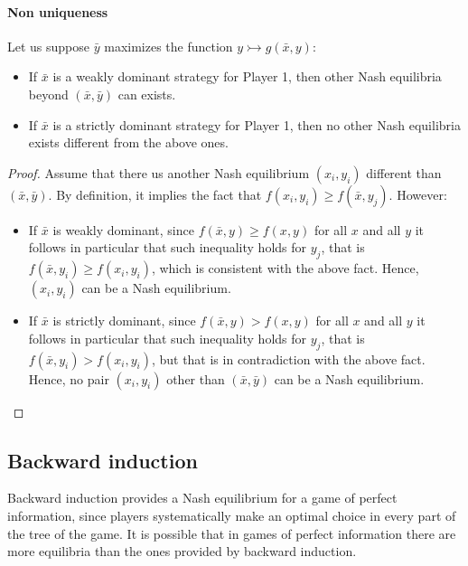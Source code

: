 \paragraph*{Non uniqueness}
Let us suppose $\bar{y}$ maximizes the function $y\rightarrowtail g(\bar{x},y)$: 
\begin{itemize}
    \item If $\bar{x}$ is a weakly dominant strategy for Player 1, then other Nash equilibria beyond $(\bar{x},\bar{y})$ can exists.
    \item If $\bar{x}$ is a strictly dominant strategy for Player 1, then no other Nash equilibria exists different from the above ones. 
\end{itemize}
\begin{proof}
    Assume that there us another Nash equilibrium $(x_i,y_i)$ different than $(\bar{x},\bar{y})$. 
    By definition, it implies the fact that $f(x_i,y_i)\geq f(\bar{x},y_j)$.
    However: 
    \begin{itemize}
        \item If $\bar{x}$ is weakly dominant, since $f(\bar{x},y)\geq f(x,y)$ for all $x$ and all $y$ it follows in particular that such inequality holds for $y_j$, that is $f(\bar{x},y_i)\geq f(x_i,y_i)$, which is consistent with the above fact. 
            Hence, $(x_i,y_i)$ can be a Nash equilibrium. 
        \item If $\bar{x}$ is strictly dominant, since $f(\bar{x},y)>f(x,y)$ for all $x$ and all $y$ it follows in particular that such inequality holds for $y_j$, that is $f(\bar{x},y_i)> f(x_i,y_i)$, but that is in contradiction with the above fact. 
            Hence, no pair $(x_i,y_i)$ other than $(\bar{x},\bar{y})$ can be a Nash equilibrium. 
    \end{itemize}
\end{proof}

\subsection{Backward induction}
Backward induction provides a Nash equilibrium for a game of perfect information, since players systematically make an optimal choice in every part of the tree of the game. 
It is possible that in games of perfect information there are more equilibria than the ones provided by backward induction. 

